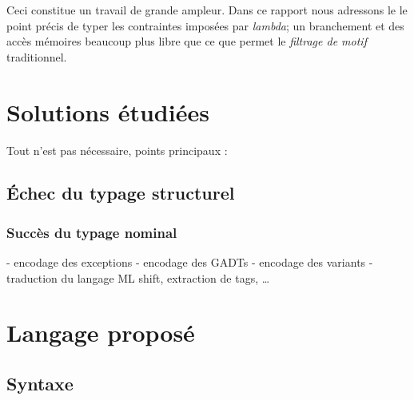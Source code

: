 \documentclass[12pt]{report}
\begin{document}
Ceci constitue un travail de grande ampleur. Dans ce rapport nous adressons le
le point précis de typer les contraintes imposées par \emph{lambda};
un branchement et des accès mémoires beaucoup plus libre que ce que permet le
\emph{filtrage de motif} traditionnel.

\chapter{Solutions étudiées}

Tout n'est pas nécessaire, points principaux :

\section{Échec du typage structurel}

\subsection{Succès du typage nominal}

- encodage des exceptions
- encodage des GADTs
- encodage des variants
  - traduction du langage ML
    shift, extraction de tags, …

\chapter{Langage proposé}

\section{Syntaxe}
\end{document}
